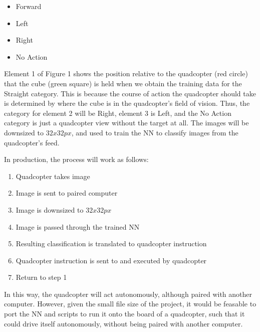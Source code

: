 \documentclass[12pt]{article}
\begin{document}
{	\begin{itemize}
		\item Forward
		\item Left
		\item Right
		\item No Action
	\end{itemize}

	\quad Element 1 of Figure 1 shows the position relative to the quadcopter (red circle) that the cube (green square) is held when we obtain the training data for the Straight category. This is because the course of action the quadcopter should take is determined by where the cube is in the quadcopter's field of vision. Thus, the category for element 2 will be Right, element 3 is Left, and the No Action category is just a quadcopter view without the target at all. The images will be downsized to $32x32px$, and used to train the NN to classify images from the quadcopter's feed. \newline

	\quad In production, the process will work as follows:
	
	\begin{enumerate}
		\item{Quadcopter takes image}
		\item{Image is sent to paired computer}
		\item{Image is downsized to $32x32px$}
		\item{Image is passed through the trained NN}
		\item{Resulting classification is translated to quadcopter instruction}
		\item{Quadcopter instruction is sent to and executed by quadcopter}	
		\item{Return to step 1}
	\end{enumerate}
	
	\quad In this way, the quadcopter will act autonomously, although paired with another computer. However, given the small file size of the project, it would be feasable to port the NN and scripts to run it onto the board of a quadcopter, such that it could drive itself autonomously, without being paired with another computer.

}
\end{document}

